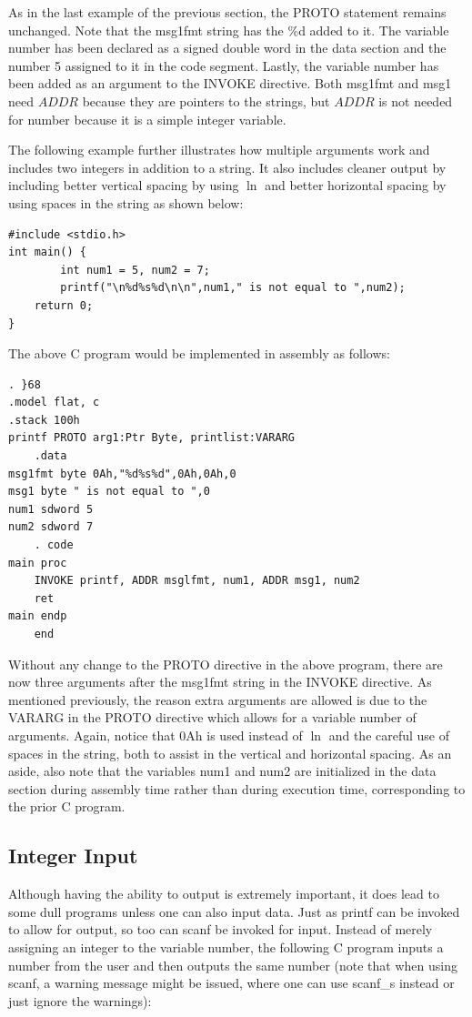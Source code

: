 \documentclass[10pt]{book}
\begin{document}
As in the last example of the previous section, the PROTO statement remains unchanged. Note that the msg1fmt string has the \%d added to it. The variable number has been declared as a signed double word in the data section and the number 5 assigned to it in the code segment. Lastly, the variable number has been added as an argument to the INVOKE directive. Both msg1fmt and msg1 need $A D D R$ because they are pointers to the strings, but $A D D R$ is not needed for number because it is a simple integer variable.

The following example further illustrates how multiple arguments work and includes two integers in addition to a string. It also includes cleaner output by including better vertical spacing by using $\ln$ and better horizontal spacing by using spaces in the string as shown below:

\begin{verbatim}
#include <stdio.h>
int main() {
        int num1 = 5, num2 = 7;
        printf("\n%d%s%d\n\n",num1," is not equal to ",num2);
    return 0;
}
\end{verbatim}

The above C program would be implemented in assembly as follows:


\begin{verbatim}
. }68
.model flat, c
.stack 100h
printf PROTO arg1:Ptr Byte, printlist:VARARG
    .data
msg1fmt byte 0Ah,"%d%s%d",0Ah,0Ah,0
msg1 byte " is not equal to ",0
num1 sdword 5
num2 sdword 7
    . code
main proc
    INVOKE printf, ADDR msglfmt, num1, ADDR msg1, num2
    ret
main endp
    end
\end{verbatim}

Without any change to the PROTO directive in the above program, there are now three arguments after the msg1fmt string in the INVOKE directive. As mentioned previously, the reason extra arguments are allowed is due to the VARARG in the PROTO directive which allows for a variable number of arguments. Again, notice that 0Ah is used instead of $\ln$ and the careful use of spaces in the string, both to assist in the vertical and horizontal spacing. As an aside, also note that the variables num1 and num2 are initialized in the data section during assembly time rather than during execution time, corresponding to the prior C program.

\subsection{Integer Input}
Although having the ability to output is extremely important, it does lead to some dull programs unless one can also input data. Just as printf can be invoked to allow for output, so too can scanf be invoked for input. Instead of merely assigning an integer to the variable number, the following C program inputs a\\
number from the user and then outputs the same number (note that when using scanf, a warning message might be issued, where one can use scanf\_s instead or just ignore the warnings):
\end{document}
